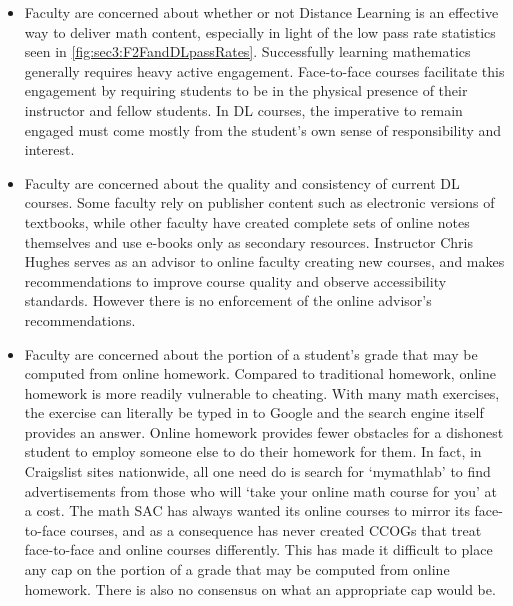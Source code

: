 \begin{itemize}
\item Faculty are concerned about whether or not Distance Learning is an
  effective way to deliver math content, especially in light of the low pass
  rate statistics seen in \cref{fig:sec3:F2FandDLpassRates}. Successfully
  learning mathematics generally requires heavy active engagement. Face-to-face
  courses facilitate this engagement by requiring students to be in the physical
  presence of their instructor and fellow students. In DL courses, the
  imperative to remain engaged must come mostly from the student's own sense of
  responsibility and interest.
\item Faculty are concerned about the quality and consistency of current DL
  courses. Some faculty rely on publisher content such as electronic versions of
  textbooks, while other faculty have created complete sets of online notes
  themselves and use e-books only as secondary resources. Instructor Chris
  Hughes serves as an advisor to online faculty creating new courses, and makes
  recommendations to improve course quality and observe accessibility standards.
  However there is no enforcement of the online advisor's recommendations.
\item Faculty are concerned about the portion of a student's grade that may be
  computed from online homework. Compared to traditional homework, online
  homework is more readily vulnerable to cheating. With many math exercises, the
  exercise can literally be typed in to Google and the search engine itself
  provides an answer. Online homework provides fewer obstacles for a dishonest
  student to employ someone else to do their homework for them. In fact, in
  Craigslist sites nationwide, all one need do is search for `mymathlab' to find
  advertisements from those who will `take your online math course for you' at a
  cost. The math SAC has always wanted its online courses to mirror its
  face-to-face courses, and as a consequence has never created CCOGs that treat
  face-to-face and online courses differently. This has made it difficult to
  place any cap on the portion of a grade that may be computed from online
  homework. There is also no consensus on what an appropriate cap would be.
\end{itemize}


